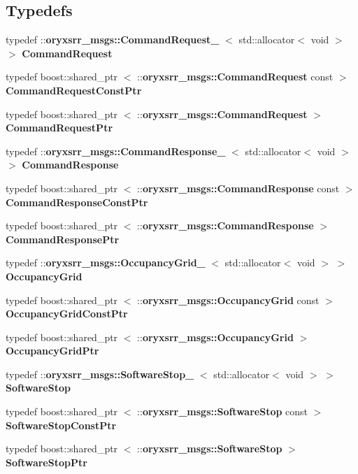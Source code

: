 \subsection*{\-Typedefs}
\begin{DoxyCompactItemize}
\item 
typedef \*
\-::{\bf oryxsrr\-\_\-msgs\-::\-Command\-Request\-\_\-}\*
$<$ std\-::allocator$<$ void $>$ $>$ {\bf \-Command\-Request}
\item 
typedef boost\-::shared\-\_\-ptr\*
$<$ \-::{\bf oryxsrr\-\_\-msgs\-::\-Command\-Request} \*
const  $>$ {\bf \-Command\-Request\-Const\-Ptr}
\item 
typedef boost\-::shared\-\_\-ptr\*
$<$ \-::{\bf oryxsrr\-\_\-msgs\-::\-Command\-Request} $>$ {\bf \-Command\-Request\-Ptr}
\item 
typedef \*
\-::{\bf oryxsrr\-\_\-msgs\-::\-Command\-Response\-\_\-}\*
$<$ std\-::allocator$<$ void $>$ $>$ {\bf \-Command\-Response}
\item 
typedef boost\-::shared\-\_\-ptr\*
$<$ \-::{\bf oryxsrr\-\_\-msgs\-::\-Command\-Response} \*
const  $>$ {\bf \-Command\-Response\-Const\-Ptr}
\item 
typedef boost\-::shared\-\_\-ptr\*
$<$ \-::{\bf oryxsrr\-\_\-msgs\-::\-Command\-Response} $>$ {\bf \-Command\-Response\-Ptr}
\item 
typedef \*
\-::{\bf oryxsrr\-\_\-msgs\-::\-Occupancy\-Grid\-\_\-}\*
$<$ std\-::allocator$<$ void $>$ $>$ {\bf \-Occupancy\-Grid}
\item 
typedef boost\-::shared\-\_\-ptr\*
$<$ \-::{\bf oryxsrr\-\_\-msgs\-::\-Occupancy\-Grid} \*
const  $>$ {\bf \-Occupancy\-Grid\-Const\-Ptr}
\item 
typedef boost\-::shared\-\_\-ptr\*
$<$ \-::{\bf oryxsrr\-\_\-msgs\-::\-Occupancy\-Grid} $>$ {\bf \-Occupancy\-Grid\-Ptr}
\item 
typedef \*
\-::{\bf oryxsrr\-\_\-msgs\-::\-Software\-Stop\-\_\-}\*
$<$ std\-::allocator$<$ void $>$ $>$ {\bf \-Software\-Stop}
\item 
typedef boost\-::shared\-\_\-ptr\*
$<$ \-::{\bf oryxsrr\-\_\-msgs\-::\-Software\-Stop} \*
const  $>$ {\bf \-Software\-Stop\-Const\-Ptr}
\item 
typedef boost\-::shared\-\_\-ptr\*
$<$ \-::{\bf oryxsrr\-\_\-msgs\-::\-Software\-Stop} $>$ {\bf \-Software\-Stop\-Ptr}
\end{DoxyCompactItemize}
